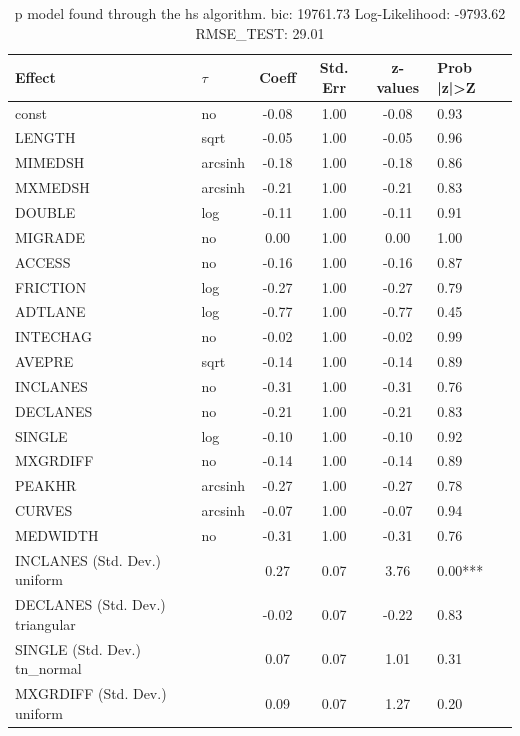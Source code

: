 \begin{table}
	\caption{p model found through the hs algorithm. bic: 19761.73 Log-Likelihood: -9793.62 RMSE_TEST: 29.01}
	\begin{center}
		\begin{tabular}{|l|l|c|c|c|l|}
			\hline
			Effect & $\tau$ & Coeff & Std. Err & z-values & Prob |z|>Z \\
			\hline
			const & no & -0.08 & 1.00 & -0.08 & 0.93 \\
			\hline
			LENGTH & sqrt & -0.05 & 1.00 & -0.05 & 0.96 \\
			\hline
			MIMEDSH & arcsinh & -0.18 & 1.00 & -0.18 & 0.86 \\
			\hline
			MXMEDSH & arcsinh & -0.21 & 1.00 & -0.21 & 0.83 \\
			\hline
			DOUBLE & log & -0.11 & 1.00 & -0.11 & 0.91 \\
			\hline
			MIGRADE & no & 0.00 & 1.00 & 0.00 & 1.00 \\
			\hline
			ACCESS & no & -0.16 & 1.00 & -0.16 & 0.87 \\
			\hline
			FRICTION & log & -0.27 & 1.00 & -0.27 & 0.79 \\
			\hline
			ADTLANE & log & -0.77 & 1.00 & -0.77 & 0.45 \\
			\hline
			INTECHAG & no & -0.02 & 1.00 & -0.02 & 0.99 \\
			\hline
			AVEPRE & sqrt & -0.14 & 1.00 & -0.14 & 0.89 \\
			\hline
			INCLANES & no & -0.31 & 1.00 & -0.31 & 0.76 \\
			\hline
			DECLANES & no & -0.21 & 1.00 & -0.21 & 0.83 \\
			\hline
			SINGLE & log & -0.10 & 1.00 & -0.10 & 0.92 \\
			\hline
			MXGRDIFF & no & -0.14 & 1.00 & -0.14 & 0.89 \\
			\hline
			PEAKHR & arcsinh & -0.27 & 1.00 & -0.27 & 0.78 \\
			\hline
			CURVES & arcsinh & -0.07 & 1.00 & -0.07 & 0.94 \\
			\hline
			MEDWIDTH & no & -0.31 & 1.00 & -0.31 & 0.76 \\
			\hline
			INCLANES (Std. Dev.) uniform &  & 0.27 & 0.07 & 3.76 & 0.00*** \\
			\hline
			DECLANES (Std. Dev.) triangular &  & -0.02 & 0.07 & -0.22 & 0.83 \\
			\hline
			SINGLE (Std. Dev.) tn_normal &  & 0.07 & 0.07 & 1.01 & 0.31 \\
			\hline
			MXGRDIFF (Std. Dev.) uniform &  & 0.09 & 0.07 & 1.27 & 0.20 \\

\end{tabular}
\end{center}
\end{table}
